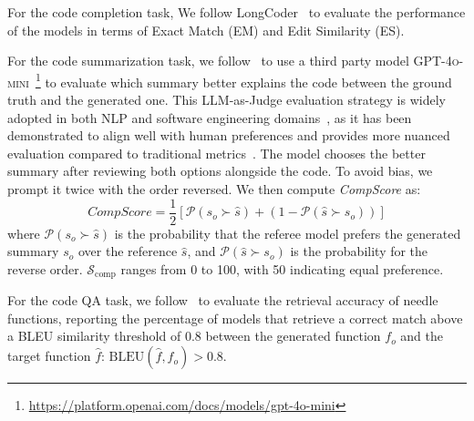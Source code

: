\documentclass[10pt,conference]{IEEEtran}
\newcommand{\edit}[1]{{\color{black}#1}}
\begin{document}
For the code completion task, We follow LongCoder~\cite{guo2023longcoder} to evaluate the performance of the models in terms of Exact Match (EM) and Edit Similarity (ES). 

For the code summarization task, we follow~\cite{bogomolov2024long} to use a third party model \textsc{GPT-4o-mini}~\footnote{\url{https://platform.openai.com/docs/models/gpt-4o-mini}} to evaluate which summary better explains the code between the ground truth and the generated one. \edit{This LLM-as-Judge evaluation strategy is widely adopted in both NLP and software engineering domains~\cite{liu2023g,song2024finesure}, as it has been demonstrated to align well with human preferences and provides more nuanced evaluation compared to traditional metrics~\cite{wang2025can,he2025code}.} The model chooses the better summary after reviewing both options alongside the code. To avoid bias, we prompt it twice with the order reversed. We then compute \textit{CompScore} as:
\begin{equation}
\textit{CompScore} = \frac{1}{2}[\mathcal{P}(s_o \succ \hat{s}) + (1 - \mathcal{P}(\hat{s} \succ s_o))]
\end{equation}
where $\mathcal{P}(s_o \succ \hat{s})$ is the probability that the referee model prefers the generated summary $s_o$ over the reference $\hat{s}$, and $\mathcal{P}(\hat{s} \succ s_o)$ is the probability for the reverse order. $\mathcal{S}_{\text{comp}}$ ranges from 0 to 100, with 50 indicating equal preference.

For the code QA task, we follow~\cite{liu2024repoqa} to evaluate the retrieval accuracy of needle functions, reporting the percentage of models that retrieve a correct match above a BLEU similarity threshold of 0.8 between the generated function $f_o$ and the target function $\hat{f}$: $\text{BLEU}(\hat{f}, f_o) > 0.8$.
\end{document}
